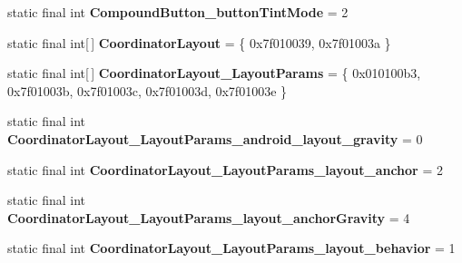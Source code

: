 \begin{DoxyCompactItemize}
\item 
\hypertarget{classandroid_1_1support_1_1design_1_1_r_1_1styleable_a11e8a842e9e3521d89857eb2305fcbb8}{}static final int {\bfseries Compound\+Button\+\_\+button\+Tint\+Mode} = 2\label{classandroid_1_1support_1_1design_1_1_r_1_1styleable_a11e8a842e9e3521d89857eb2305fcbb8}

\item 
\hypertarget{classandroid_1_1support_1_1design_1_1_r_1_1styleable_aa61378a506fc889e9e7af20a32b5fa05}{}static final int\mbox{[}$\,$\mbox{]} {\bfseries Coordinator\+Layout} = \{ 0x7f010039, 0x7f01003a \}\label{classandroid_1_1support_1_1design_1_1_r_1_1styleable_aa61378a506fc889e9e7af20a32b5fa05}

\item 
\hypertarget{classandroid_1_1support_1_1design_1_1_r_1_1styleable_a8dd236b417b377b73830c1c47c3b2490}{}static final int\mbox{[}$\,$\mbox{]} {\bfseries Coordinator\+Layout\+\_\+\+Layout\+Params} = \{ 0x010100b3, 0x7f01003b, 0x7f01003c, 0x7f01003d, 0x7f01003e \}\label{classandroid_1_1support_1_1design_1_1_r_1_1styleable_a8dd236b417b377b73830c1c47c3b2490}

\item 
\hypertarget{classandroid_1_1support_1_1design_1_1_r_1_1styleable_a0b1c358f3d77ab88589600a4ad9d8993}{}static final int {\bfseries Coordinator\+Layout\+\_\+\+Layout\+Params\+\_\+android\+\_\+layout\+\_\+gravity} = 0\label{classandroid_1_1support_1_1design_1_1_r_1_1styleable_a0b1c358f3d77ab88589600a4ad9d8993}

\item 
\hypertarget{classandroid_1_1support_1_1design_1_1_r_1_1styleable_ad825a1a8e26fae66b62b3fe8c990912b}{}static final int {\bfseries Coordinator\+Layout\+\_\+\+Layout\+Params\+\_\+layout\+\_\+anchor} = 2\label{classandroid_1_1support_1_1design_1_1_r_1_1styleable_ad825a1a8e26fae66b62b3fe8c990912b}

\item 
\hypertarget{classandroid_1_1support_1_1design_1_1_r_1_1styleable_a09934e543b24969b754910bc4ec629b7}{}static final int {\bfseries Coordinator\+Layout\+\_\+\+Layout\+Params\+\_\+layout\+\_\+anchor\+Gravity} = 4\label{classandroid_1_1support_1_1design_1_1_r_1_1styleable_a09934e543b24969b754910bc4ec629b7}

\item 
\hypertarget{classandroid_1_1support_1_1design_1_1_r_1_1styleable_a4b30334ae35f54e65121ea7da1301f70}{}static final int {\bfseries Coordinator\+Layout\+\_\+\+Layout\+Params\+\_\+layout\+\_\+behavior} = 1\label{classandroid_1_1support_1_1design_1_1_r_1_1styleable_a4b30334ae35f54e65121ea7da1301f70}


\end{DoxyCompactItemize}
